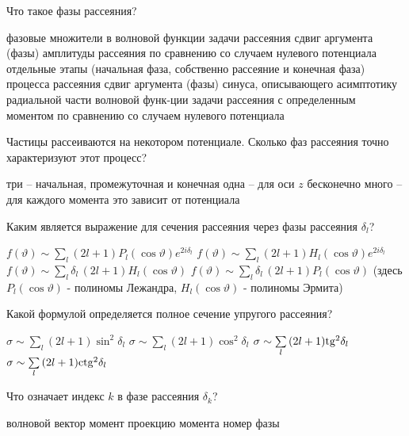 \documentclass[11pt,a4paper]{exam}
\begin{document}
\begin{questions}
\question Что такое фазы рассеяния?
\begin{choices}
\choice фазовые множители в волновой функции задачи рассеяния
\choice сдвиг аргумента (фазы) амплитуды рассеяния по сравнению со случаем нулевого потенциала
\choice отдельные этапы (начальная фаза, собственно рассеяние и конечная фаза) процесса рассеяния
\choice сдвиг аргумента (фазы) синуса, описывающего асимптотику радиальной части волновой функ-ции задачи рассеяния с определенным моментом по сравнению со случаем нулевого потенциала
\end{choices}

\question Частицы рассеиваются на некотором потенциале. Сколько фаз рассеяния точно характеризуют этот процесс?
\begin{choices}
\choice три – начальная, промежуточная и конечная    
\choice одна – для оси $z$
\choice бесконечно много – для каждого момента    
\choice это зависит от потенциала
\end{choices}

\question Каким является выражение для сечения рассеяния через фазы рассеяния ${\delta _l}$?
\begin{choices}
\choice $f(\vartheta ) \sim \sum\limits_l {(2l + 1){P_l}(\cos \vartheta ){e^{2i{\delta _l}}}} $      
\choice $f(\vartheta ) \sim \sum\limits_l {(2l + 1){H_l}(\cos \vartheta ){e^{2i{\delta _l}}}} $
\choice $f(\vartheta ) \sim \sum\limits_l {{\delta _l}\,(2l + 1){H_l}(\cos \vartheta )} $      
\choice $f(\vartheta ) \sim \sum\limits_l {{\delta _l}\,(2l + 1){P_l}(\cos \vartheta )} $
(здесь ${P_l}(\cos \vartheta )$ - полиномы Лежандра, ${H_l}(\cos \vartheta )$ - полиномы Эрмита)
\end{choices}

\question Какой формулой определяется полное сечение упругого рассеяния?
\begin{choices}
\choice $\sigma  \sim \sum\limits_l {(2l + 1){{\sin }^2}{\delta _l}} $    
\choice $\sigma  \sim \sum\limits_l {(2l + 1){{\cos }^2}{\delta _l}} $
\choice $\sigma  \sim \sum\limits_l {(2l + 1){\rm{t}}{{\rm{g}}^2}{\delta _l}} $    
\choice $\sigma  \sim \sum\limits_l {(2l + 1){\rm{ct}}{{\rm{g}}^2}{\delta _l}} $
\end{choices}

\question Что означает индекс $k$ в фазе рассеяния ${\delta _k}$?
\begin{choices}
\choice волновой вектор         
\choice момент
\choice проекцию момента     
\choice номер фазы
\end{choices}


\end{questions}
\end{document}
